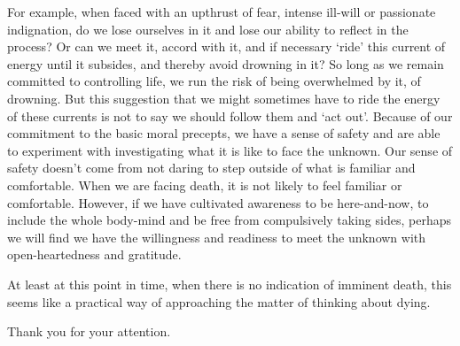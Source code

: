 For example, when faced with an upthrust of fear, intense ill-will or
passionate indignation, do we lose ourselves in it and lose our ability
to reflect in the process? Or can we meet it, accord with it, and if
necessary ‘ride’ this current of energy until it subsides, and thereby
avoid drowning in it? So long as we remain committed to controlling
life, we run the risk of being overwhelmed by it, of drowning. But this
suggestion that we might sometimes have to ride the energy of these
currents is not to say we should follow them and ‘act out’. Because of
our commitment to the basic moral precepts, we have a sense of safety
and are able to experiment with investigating what it is like to face
the unknown. Our sense of safety doesn’t come from not daring to step
outside of what is familiar and comfortable. When we are facing death,
it is not likely to feel familiar or comfortable. However, if we have
cultivated awareness to be here-and-now, to include the whole body-mind
and be free from compulsively taking sides, perhaps we will find we have
the willingness and readiness to meet the unknown with open-heartedness
and gratitude.

At least at this point in time, when there is no indication of imminent
death, this seems like a practical way of approaching the matter of
thinking about dying.

Thank you for your attention.

